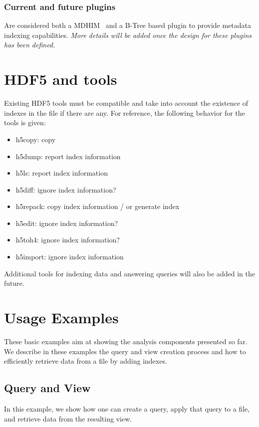 \subsubsection{Current and future plugins}

Are considered both a MDHIM~\cite{Greenberg15} and a B-Tree based plugin to
provide metadata indexing capabilities. \textit{More details will be added
once the design for these plugins has been defined.}

\section{HDF5 and tools}

Existing HDF5 tools must be compatible and take into account the existence of
indexes in the file if there are any. For reference, the following behavior for
the tools is given:

\begin{itemize}
\item h5copy: copy
\item h5dump: report index information
\item h5ls: report index information
\item h5diff: ignore index information?
\item h5repack: copy index information / or generate index
\item h5edit: ignore index information?
\item h5toh4: ignore index information?
\item h5import: ignore index information
\end{itemize}

Additional tools for indexing data and answering queries will also be added
in the future.

\section{Usage Examples}

These basic examples aim at showing the analysis components presented so far.
We describe in these examples the query and view creation process and how to
efficiently retrieve data from a file by adding indexes.

\subsection{Query and View}
In this example, we show how one can create a query, apply that query to a file,
and retrieve data from the resulting view.

